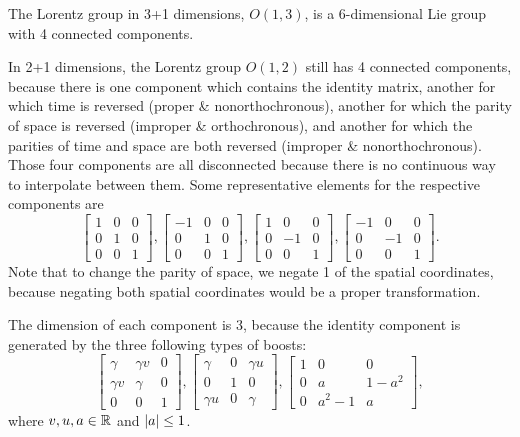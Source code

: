 \documentclass{article}
\begin{document}
\bigskip
\par
\begin{prob}
\end{prob}
The Lorentz group in 3+1 dimensions, $O(1,3)$, is a 6-dimensional Lie group with 4 connected components.
\par
In 2+1 dimensions, the Lorentz group $O(1,2)$ still has 4 connected components, because there is one component which contains the identity matrix, another for which time is reversed (proper \& nonorthochronous), another for which the parity of space is reversed (improper \& orthochronous), and another for which the parities of time and space are both reversed (improper \& nonorthochronous). Those four components are all disconnected because there is no continuous way to interpolate between them. Some representative elements for the respective components are
\[ \begin{bmatrix}
    1 & 0 & 0 \\
    0 & 1 & 0 \\
    0 & 0 & 1
\end{bmatrix}, \begin{bmatrix}
    -1 & 0 & 0 \\
    0 & 1 & 0 \\
    0 & 0 & 1
\end{bmatrix}, \begin{bmatrix}
    1 & 0 & 0 \\
    0 & -1 & 0 \\
    0 & 0 & 1
\end{bmatrix}, \begin{bmatrix}
    -1 & 0 & 0 \\
    0 & -1 & 0 \\
    0 & 0 & 1
\end{bmatrix}. \]
Note that to change the parity of space, we negate 1 of the spatial coordinates, because negating both spatial coordinates would be a proper transformation.
\par
The dimension of each component is 3, because the identity component is generated by the three following types of boosts:
\[ \begin{bmatrix}
    \gamma & \gamma v & 0 \\
    \gamma v & \gamma & 0 \\
    0 & 0 & 1
\end{bmatrix}, \begin{bmatrix}
    \gamma & 0 & \gamma u \\
    0 & 1 & 0 \\
    \gamma u & 0 & \gamma
\end{bmatrix}, \begin{bmatrix}
    1 & 0 & 0 \\
    0 & a & 1-a^2 \\
    0 & a^2-1 & a
\end{bmatrix}, \]
where $v, u, a \in \mathbb{R}$ and $\left\lvert a \right\rvert\leq 1$.
\end{document}
